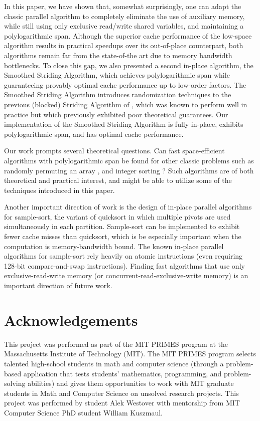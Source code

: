 \documentclass[11pt]{article}
\theoremstyle{remark}
\theoremstyle{remark}
\begin{document}
In this paper, we have shown that, somewhat surprisingly, one can
adapt the classic parallel algorithm to completely eliminate the use
of auxiliary memory, while still using only exclusive read/write
shared variables, and maintaining a polylogarithmic span. Although the
superior cache performance of the low-space algorithm results in
practical speedups over its out-of-place counterpart, both algorithms
remain far from the state-of-the art due to memory bandwidth bottlenecks. To close this gap, we also
presented a second in-place algorithm, the Smoothed Striding
Algorithm, which achieves polylogarithmic span while guaranteeing
provably optimal cache performance up to low-order factors. The
Smoothed Striding Algorithm introduces randomization techniques to the
previous (blocked) Striding Algorithm of \cite{Frias08, FrancisPa92},
which was known to perform well in practice but which previously
exhibited poor theoretical guarantees. Our implementation of the
Smoothed Striding Algorithm is fully in-place, exhibits
polylogarithmic span, and has optimal cache performance.

Our work prompts several theoretical questions. Can fast
space-efficient algorithms with polylogarithmic span be found for
other classic problems such as randomly permuting an array
\cite{Anderson90, AlonsoSc96, ShunGu15}, and integer sorting
\cite{Rajasekaran92, HanHe12, AlbersHa97, Han01, GerbessiotisSi04}?
Such algorithms are of both theoretical and practical interest, and
might be able to utilize some of the techniques introduced in this
paper.

Another important direction of work is the design of in-place parallel
algorithms for sample-sort, the variant of quicksort in which multiple
pivots are used simultaneously in each partition. Sample-sort can be
implemented to exhibit fewer cache misses than quicksort, which is be
especially important when the computation is memory-bandwidth
bound. The known in-place parallel algorithms for sample-sort rely
heavily on atomic instructions \cite{AxtmannWi17} (even requiring
128-bit compare-and-swap instructions). Finding fast algorithms that
use only exclusive-read-write memory (or
concurrent-read-exclusive-write memory) is an important direction of
future work.


\section{Acknowledgements}

This project was performed as part of the MIT PRIMES program at the
Massachusetts Institute of Technology (MIT). The MIT PRIMES program
selects talented high-school students in math and computer science
(through a problem-based application that tests students' mathematics,
programming, and problem-solving abilities) and gives them
opportunities to work with MIT graduate students in Math and Computer
Science on unsolved research projects. This project was performed by
student Alek Westover with mentorship from MIT Computer Science PhD
student William Kuszmaul.
\end{document}

